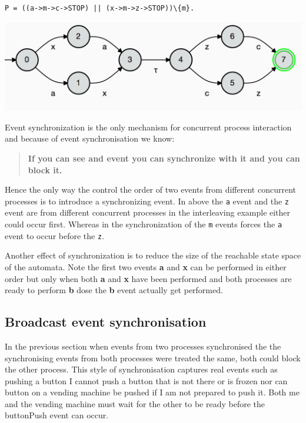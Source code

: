\documentclass[]{article}
\begin{document}
  
 \begin{center} 
\begin{minipage}{0.5\textwidth}
\begin{verbatim}
P = ((a->m->c->STOP) || (x->m->z->STOP))\{m}.
\end{verbatim} 
\end{minipage}  

\includegraphics[scale=0.5]{Sync.png}

\end{center}

\noindent Event synchronization is the only mechanism for concurrent process interaction and because of event synchronisation we know: 

\begin{quote}
{\bf If you can see and event you can synchronize with it and you can block it.}
\end{quote}


 
 
 
 Hence the only way  the  control the order of two events from different concurrent   processes is to introduce a synchronizing event. In above the \verb$a$ event and the \verb$z$ event are from different concurrent processes in the interleaving example either could occur first. Whereas in the synchronization of the \verb$m$ events forces the \verb$a$ event to occur before the \verb$z$. 
 
Another  effect of synchronization   is to reduce the size of the reachable state space of the automata. Note the first two events {\bf a} and {\bf x} can be performed in either order but only when both {\bf a} and {\bf x} have been performed and both processes are ready to perform {\bf b} dose the {\bf b}  event actually get performed.


\subsection{Broadcast event synchronisation}
In the previous section when events from two processes synchronised  the the synchronising events from both processes were treated the same, both could block the other process. This style of synchronisation captures real events such as {\sf pushing a button} I cannot push a button that is not there or is frozen nor can  button on a vending machine be pushed if  I am not prepared  to push it. Both me and the vending machine must wait for the other to be ready before the {\sf buttonPush} event can occur. 
\end{document}
